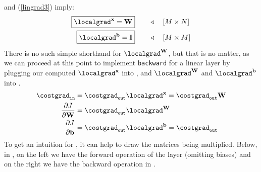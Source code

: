 \Eqns{\ref{lingrad1}} and (\ref{lingrad3}) imply:
\begin{align}
    \boxed{\localgrad^{\mathbf{x}} = \mathbf{W}} & \quad\quad \triangleleft \quad [M \times N] \\
    \boxed{\localgrad^{\mathbf{b}} = \mathbf{I}} & \quad\quad \triangleleft \quad [M \times M]
\end{align}
There is no such simple shorthand for $\localgrad^\mathbf{W}$, but that is no matter, as we can proceed at this point to implement \texttt{backward} for a linear layer by plugging our computed $\localgrad^\mathbf{x}$ into \eqn{\ref{eqn:backpropagation:backward}}, and $\localgrad^\mathbf{W}$ and $\localgrad^\mathbf{b}$ into \eqn{\ref{eqn:backpropagation:djdtheta}}.
\begin{align}
    \costgrad_{\texttt{in}}                & = \costgrad_{\texttt{out}}\localgrad^{\mathbf{x}} = \costgrad_{\texttt{out}}\mathbf{W} \label{eqn:backpropagation:linear_backward_costgrad} \\
    \frac{\partial J}{\partial \mathbf{W}} & =  \costgrad_{\texttt{out}}\localgrad^{\mathbf{W}}                                                                                          \\
    \frac{\partial J}{\partial \mathbf{b}} & = \costgrad_{\texttt{out}}\localgrad^{\mathbf{b}} = \costgrad_{\texttt{out}}
\end{align}
To get an intuition for \eqn{\ref{eqn:backpropagation:linear_backward_costgrad}}, it can help to draw the matrices being multiplied. Below, in \fig{\ref{fig:backpropagation:linear_forward_backward_matrices}}, on the left we have the forward operation of the layer (omitting biases) and on the right we have the backward operation in \eqn{\ref{eqn:backpropagation:linear_backward_costgrad}}.
